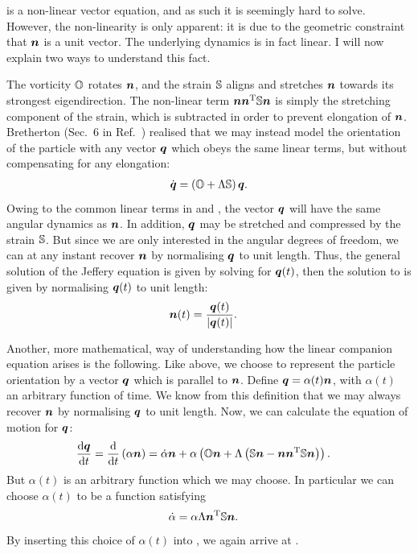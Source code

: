 \documentclass[thesis.tex]{subfiles}
\begin{document}
 is a non-linear vector equation, and as such it is seemingly hard to solve. However, the non-linearity is only apparent: it is due to the geometric constraint that $\mbox{\boldmath$n$}$ is a unit vector. The underlying dynamics is in fact linear. I will now explain two ways to understand this fact.

The vorticity $\mathbb{O}$ rotates $\mbox{\boldmath$n$}$, and the strain $\mathbb{S}$ aligns and stretches $\mbox{\boldmath$n$}$ towards its strongest eigendirection. The non-linear term $\mbox{\boldmath$n$} \mbox{\boldmath$n$}^{\mathrm T} \mathbb{S} \mbox{\boldmath$n$}$ is simply the stretching component of the strain, which is subtracted in order to prevent elongation of $\mbox{\boldmath$n$}$. Bretherton (Sec.~6 in Ref.~) realised that we may instead model the orientation of the particle with any vector $\mbox{\boldmath$q$}$ which obeys the same linear terms, but without compensating for any elongation:
\begin{align}
	\dot{\ve q} = \left(\ma O + \Lambda \ma S\right) \ve q.\eqnlab{jefferyq}
\end{align}
Owing to the common linear terms in  and , the vector $\mbox{\boldmath$q$}$ will have the same angular dynamics as $\mbox{\boldmath$n$}$. In addition, $\mbox{\boldmath$q$}$ may be stretched and compressed by the strain $\mathbb{S}$. But since we are only interested in the angular degrees of freedom, we can at any instant recover $\mbox{\boldmath$n$}$ by normalising $\mbox{\boldmath$q$}$ to unit length. Thus, the general solution of the Jeffery equation is given by solving  for $\mbox{\boldmath$q$}(t)$, then the solution to  is given by normalising $\mbox{\boldmath$q$}(t)$ to unit length:
\begin{align}
	\ve n(t) &= \frac{\ve q(t)}{|\ve q(t)|}.\eqnlab{jefferysolution0}
\end{align}

Another, more mathematical, way of understanding how the linear companion equation  arises is the following. Like above, we choose to represent the particle orientation by a vector $\mbox{\boldmath$q$}$ which is parallel to $\mbox{\boldmath$n$}$. Define $\mbox{\boldmath$q$} = \alpha(t)\mbox{\boldmath$n$}$, with $\alpha(t)$ an arbitrary function of time. We know from this definition that we may always recover $\mbox{\boldmath$n$}$ by normalising $\mbox{\boldmath$q$}$ to unit length. Now, we can calculate the equation of motion for $\mbox{\boldmath$q$}$:
\begin{align}
	\diff{\ve q}{t} &= \diff{}{t}\left(\alpha \ve n\right) 
	= \dot \alpha \ve n + \alpha \left(\ma O \ve n + \Lambda \left(\ma S \ve n - \ve n \ve n \transpose \ma S \ve n\right)\right). \eqnlab{jefferyderivation1}
\end{align}
But $\alpha(t)$ is an arbitrary function which we may choose. In particular we can choose $\alpha(t)$ to be a function satisfying
\begin{align}
	\dot \alpha &= \alpha \Lambda \mbox{\boldmath$n$}^{\mathrm T} \mathbb{S} \mbox{\boldmath$n$}.
\end{align}
By inserting this choice of $\alpha(t)$ into , we again arrive at .
\end{document}
